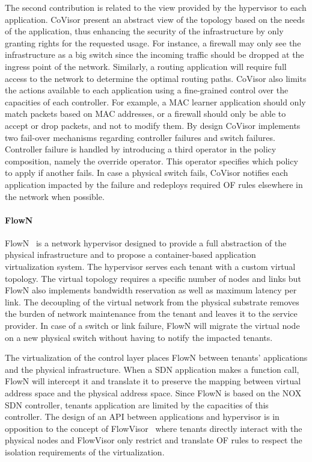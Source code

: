 The second contribution is related to the view provided by the hypervisor to each application.
CoVisor present an abstract view of the topology based on the needs of the application, thus enhancing the security of the infrastructure by only granting rights for the requested usage. 
For instance, a firewall may only see the infrastructure as a big switch since the incoming traffic should be dropped at the ingress point of the network.
Similarly, a routing application will require full access to the network to determine the optimal routing paths.
CoVisor also limits the actions available to each application using a fine-grained control over the capacities of each controller.
For example, a MAC learner application should only match packets based on MAC addresses, or a firewall should only be able to accept or drop packets, and not to modify them.
By design CoVisor implements two fail-over mechanisms regarding controller failures and switch failures.
Controller failure is handled by introducing a third operator in the policy composition, namely the override operator. This operator specifies which policy to apply if another fails.
In case a physical switch fails, CoVisor notifies each application impacted by the failure and redeploys required OF rules elsewhere in the network when possible.


\paragraph{FlowN}
FlowN~\cite{FlowN-Drutskoy2012} is a network hypervisor designed to provide a full abstraction of the physical infrastructure and to propose a container-based application virtualization system. 
The hypervisor serves each tenant with a custom virtual topology. The virtual topology requires a specific number of nodes and links but FlowN also implements bandwidth reservation as well as maximum latency per link. The decoupling of the virtual network from the physical substrate removes the burden of network maintenance from the tenant and leaves it to the service provider. In case of a switch or link failure, FlowN will migrate the virtual node on a new physical switch without having to notify the impacted tenants.

The virtualization of the control layer places FlowN between tenants' applications and the physical infrastructure. When a SDN application makes a function call, FlowN will intercept it and translate it to preserve the mapping between virtual address space and the physical address space. Since FlowN is based on the NOX~\cite{nox-gude2008} SDN controller, tenants application are limited by the capacities of this controller. 
The design of an API between applications and hypervisor is in opposition to the concept of FlowVisor~\cite{FlowVisor-Sherwood2009} where tenants directly interact with the physical nodes and FlowVisor only restrict and translate OF rules to respect the isolation requirements of the virtualization.


